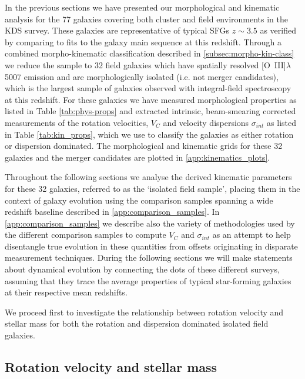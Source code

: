 \documentclass[fleqn,usenatbib]{mn2e}
\begin{document}
In the previous sections we have presented our morphological and kinematic analysis for the 77 galaxies covering both cluster and field environments in the KDS survey.
These galaxies are representative of typical SFGs $z\sim3.5$ as verified by comparing to fits to the galaxy main sequence at this redshift.
Through a combined morpho-kinematic classification described in \cref{subsec:morpho-kin-class} we reduce the sample to 32 field galaxies which have spatially resolved [O~{\sc III}]$\lambda$5007 emission and are morphologically isolated (i.e. not merger candidates), which is the largest sample of galaxies observed with integral-field spectroscopy at this redshift.
For these galaxies we have measured morphological properties as listed in Table \ref{tab:phys-props} and extracted intrinsic, beam-smearing corrected measurements of the rotation velocities, $V_{C}$ and velocity dispersions $\sigma_{int}$ as listed in Table \ref{tab:kin_props}, which we use to classify the galaxies as either rotation or dispersion dominated.
The morphological and kinematic grids for these 32 galaxies and the merger candidates are plotted in \cref{app:kinematics_plots}.

Throughout the following sections we analyse the derived kinematic parameters for these 32 galaxies, referred to as the `isolated field sample', placing them in the context of galaxy evolution using the comparison samples spanning a wide redshift baseline described in \cref{app:comparison_samples}.
In \cref{app:comparison_samples} we describe also the variety of methodologies used by the different comparison samples to compute $V_{C}$ and $\sigma_{int}$ as an attempt to help disentangle true evolution in these quantities from offsets originating in disparate measurement techniques.
During the following sections we will make statements about dynamical evolution by connecting the dots of these different surveys, assuming that they trace the average properties of typical star-forming galaxies at their respective mean redshifts.

We proceed first to investigate the relationship between rotation velocity and stellar mass for both the rotation and dispersion dominated isolated field galaxies.

\subsection{Rotation velocity and stellar mass}\label{subsec:results_rotation_vel}
\end{document}
